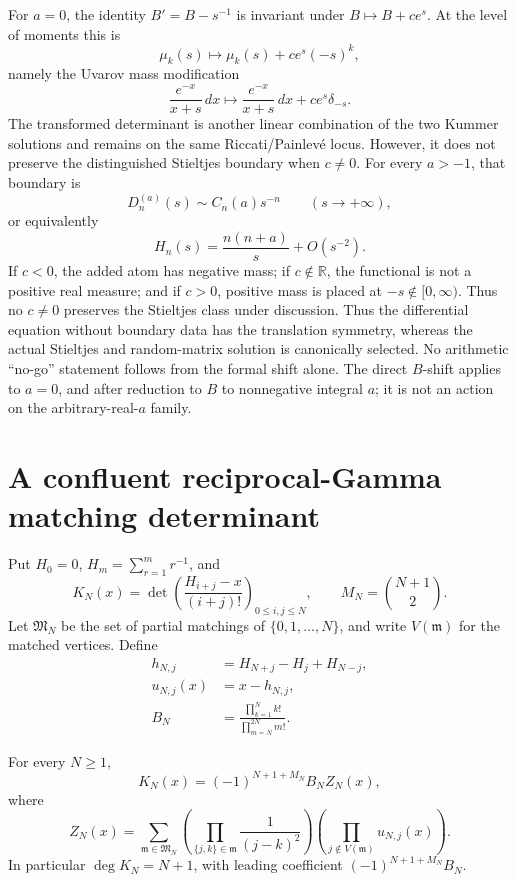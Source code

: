 For \(a=0\), the identity \(B'=B-s^{-1}\) is invariant under
\(B\mapsto B+ce^s\).  At the level of moments this is
\begin{equation}
 \mu_k(s)\longmapsto\mu_k(s)+ce^s(-s)^k,
 \label{eq:Uvarov-shift}
\end{equation}
namely the Uvarov mass modification
\[
 \frac{e^{-x}}{x+s}\,dx
 \longmapsto
 \frac{e^{-x}}{x+s}\,dx+ce^s\delta_{-s}.
\]
The transformed determinant is another linear combination of the two Kummer
solutions and remains on the same Riccati/Painlev\'e locus.  However, it does
not preserve the distinguished Stieltjes boundary when \(c\neq0\).  For every
\(a>-1\), that boundary is
\begin{equation}
 D_n^{(a)}(s)\sim C_n(a)s^{-n}\qquad(s\to+\infty),
 \label{eq:recessive-boundary}
\end{equation}
or equivalently
\[
 H_n(s)=\frac{n(n+a)}s+O(s^{-2}).
\]
If \(c<0\), the added atom has negative mass; if \(c\notin\mathbb R\), the
functional is not a positive real measure; and if \(c>0\), positive mass is
placed at \(-s\notin[0,\infty)\).  Thus no \(c\neq0\) preserves the Stieltjes
class under discussion.
Thus the differential equation without boundary data has the translation
symmetry, whereas the actual Stieltjes and random-matrix solution is
canonically selected.  No arithmetic ``no-go'' statement follows from the
formal shift alone.  The direct \(B\)-shift applies to \(a=0\), and after
reduction to \(B\) to nonnegative integral \(a\); it is not an action on the
arbitrary-real-\(a\) family.

\section{A confluent reciprocal-Gamma matching determinant}
\label{sec:reciprocal-gamma-matching}

Put \(H_0=0\), \(H_m=\sum_{r=1}^m r^{-1}\), and
\[
 K_N(x)=\det\left(\frac{H_{i+j}-x}{(i+j)!}\right)_{0\leq i,j\leq N},
 \qquad
 M_N=\binom{N+1}{2}.
\]
Let \(\mathfrak M_N\) be the set of partial matchings of
\(\{0,1,\ldots,N\}\), and write \(V(\mathfrak m)\) for the matched vertices.
Define
\begin{align*}
 h_{N,j}&=H_{N+j}-H_j+H_{N-j},\\
 u_{N,j}(x)&=x-h_{N,j},\\
 B_N&=\frac{\prod_{k=1}^Nk!}{\prod_{m=N}^{2N}m!}.
\end{align*}

\begin{theorem}
\label{thm:reciprocal-gamma-matching}
For every \(N\geq1\),
\begin{equation}
 \boxed{
 K_N(x)=(-1)^{N+1+M_N}B_N Z_N(x),}
 \label{eq:KN-matching-prefactor}
\end{equation}
where
\begin{equation}
 Z_N(x)=
 \sum_{\mathfrak m\in\mathfrak M_N}
 \left(\prod_{\{j,k\}\in\mathfrak m}\frac1{(j-k)^2}\right)
 \left(\prod_{j\notin V(\mathfrak m)}u_{N,j}(x)\right).
 \label{eq:ZN-matching}
\end{equation}
In particular \(\deg K_N=N+1\), with leading coefficient
\((-1)^{N+1+M_N}B_N\).
\end{theorem}

